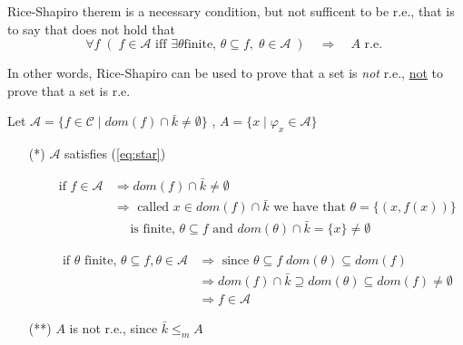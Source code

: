 \begin{observation}
  Rice-Shapiro therem is a necessary condition, but not sufficent to
  be r.e., that is to say that does not hold that
  \begin{equation}\label{eq:star}
    \forall f \; (\; f \in \mathcal{A} \mbox{ iff } \exists \theta \mbox{
      finite, } \theta \subseteq f, \; \theta \in \mathcal{A} \; ) \quad
    \Rightarrow \quad A \mbox{ r.e. } 
  \end{equation}

  In other words, Rice-Shapiro can be used to prove that a set is
  \emph{not} r.e., \underline{not} to prove that a set is r.e.
\end{observation}

\begin{counterexample}
  Let
  $\mathcal{A} = \{ f \in \mathcal{C} \mid dom(f) \cap \bar{k} \neq
  \emptyset\}$ , $A = \{x \mid \varphi_x \in \mathcal{A}\}$

  \begin{enumerate}
  \item[(*)] $\mathcal{A}$ satisfies (\ref{eq:star})
    \begin{itemize}
    \item[] \[
        \begin{aligned}
          \mbox{if } f \in \mathcal{A} & \Rightarrow dom(f) \cap \bar{k} \neq \emptyset \\
                                       & \Rightarrow \mbox{ called } x \in dom(f) \cap \bar{k} \mbox{ we have that } \theta = \{(x, f(x))\} \\
                                       & \quad \mbox{ is finite, } \theta \subseteq f \mbox{ and } dom(\theta)\cap \bar{k} = \{x\} \neq \emptyset
        \end{aligned}
      \]

    \item[] \[
        \begin{aligned}
          \mbox{if $\theta$ finite, } \theta \subseteq f, \theta \in \mathcal{A} & \Rightarrow \mbox{ since } \theta \subseteq f \; dom(\theta) \subseteq dom(f) \\
          & \Rightarrow dom(f) \cap \bar{k} \supseteq dom(\theta) \subseteq dom(f) \neq \emptyset \\
          & \Rightarrow f \in \mathcal{A}
        \end{aligned}
      \]
    \end{itemize}

  \item[(**)] $A$ is not r.e., since $\bar{k} \leq_m A$


\end{enumerate}
\end{counterexample}
